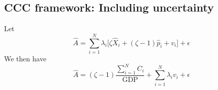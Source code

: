 \documentclass[11pt]{article}
\begin{document}
\subsection{CCC framework: Including uncertainty}


Let
\[
\hat{A} = \sum_{i=1}^N \lambda_i \Big[ \zeta \hat{X}_i + (\zeta-1) \hat{p}_i + v_i \Big] + \epsilon
\]
We then have
\[
\hat{A} = (\zeta-1) \frac{\sum_{i=1}^N C_i}{\text{GDP}} + \sum_{i=1}^N \lambda_i v_i + \epsilon
\]



\tiny
\renewcommand\bibname{References}


\normalsize
\end{document}

